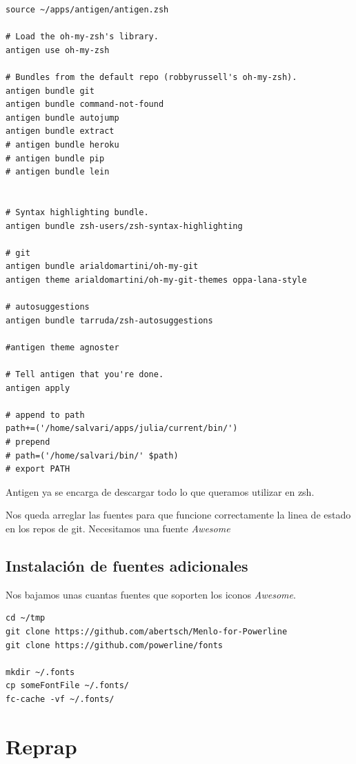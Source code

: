 \documentclass[12pt,spanish,]{scrartcl}
\begin{document}
\begin{verbatim}
source ~/apps/antigen/antigen.zsh

# Load the oh-my-zsh's library.
antigen use oh-my-zsh

# Bundles from the default repo (robbyrussell's oh-my-zsh).
antigen bundle git
antigen bundle command-not-found
antigen bundle autojump
antigen bundle extract
# antigen bundle heroku
# antigen bundle pip
# antigen bundle lein


# Syntax highlighting bundle.
antigen bundle zsh-users/zsh-syntax-highlighting

# git
antigen bundle arialdomartini/oh-my-git
antigen theme arialdomartini/oh-my-git-themes oppa-lana-style

# autosuggestions
antigen bundle tarruda/zsh-autosuggestions

#antigen theme agnoster

# Tell antigen that you're done.
antigen apply

# append to path
path+=('/home/salvari/apps/julia/current/bin/')
# prepend
# path=('/home/salvari/bin/' $path)
# export PATH
\end{verbatim}

Antigen ya se encarga de descargar todo lo que queramos utilizar en zsh.

Nos queda arreglar las fuentes para que funcione correctamente la linea
de estado en los repos de git. Necesitamos una fuente \emph{Awesome}

\hypertarget{instalaciuxf3n-de-fuentes-adicionales}{%
\subsection{Instalación de fuentes
adicionales}\label{instalaciuxf3n-de-fuentes-adicionales}}

Nos bajamos unas cuantas fuentes que soporten los iconos \emph{Awesome}.

\begin{verbatim}
cd ~/tmp
git clone https://github.com/abertsch/Menlo-for-Powerline
git clone https://github.com/powerline/fonts

mkdir ~/.fonts
cp someFontFile ~/.fonts/
fc-cache -vf ~/.fonts/
\end{verbatim}

\hypertarget{reprap}{%
\section{Reprap}\label{reprap}}
\end{document}

